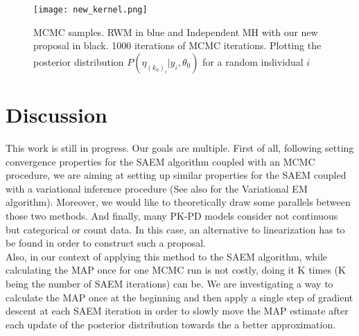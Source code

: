 \documentclass{article}
\begin{document}
\begin{figure}[ht]
\vskip 0.2in
\begin{center}
\centerline{\texttt{[image: new\_kernel.png]}}
\caption{MCMC samples. RWM in blue and Independent MH with our new proposal in black. 1000 iterations of MCMC iterations. Plotting the posterior distribution $P(\eta_{(k_a)_i}|y_i,\theta_0)$ for a random individual $i$}
\label{new}
\end{center}
\vskip -0.2in
\end{figure} 

\section{Discussion} 
This work is still in progress. Our goals are multiple. First of all, following \citep{kuhn} setting convergence properties for the SAEM algorithm coupled with an MCMC procedure, we are aiming at setting up similar properties for the SAEM coupled with a variational inference procedure (See also \citep{gunawardana} for the Variational EM algorithm). Moreover, we would like to theoretically draw some parallels between those two methods. And finally, many PK-PD models consider not continuous but categorical or count data. In this case, an alternative to linearization has to be found in order to construct such a proposal.\\
Also, in our context of applying this method to the SAEM algorithm, while calculating the MAP once for one MCMC run is not costly, doing it K times (K being the number of SAEM iterations) can be. We are investigating a way to calculate the MAP once at the beginning and then apply a single step of gradient descent at each SAEM iteration in order to slowly move the MAP estimate after each update of the posterior distribution towards the a better approximation.



\end{document}
